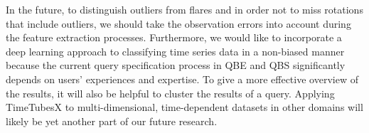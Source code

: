 In the future, 
to distinguish outliers from flares and in order not to miss rotations that include outliers,
we should take the observation errors into account during the feature extraction processes. 
Furthermore, we would like to incorporate a deep learning approach to classifying time series data in a non-biased manner because the current query specification process in QBE and QBS significantly depends on users' experiences and expertise.
To give a more effective overview of the results, it will also be helpful to cluster the results of a query. %
Applying TimeTubesX to multi-dimensional, time-dependent datasets in other domains will likely be yet another part of our future research.